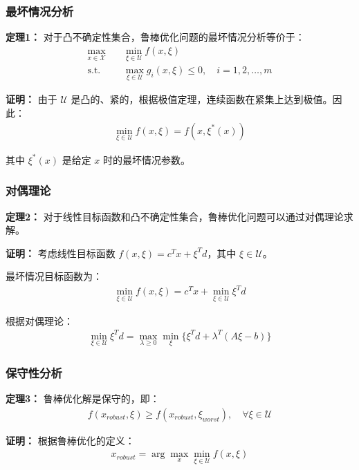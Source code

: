 \subsubsection{最坏情况分析}

\textbf{定理1：} 对于凸不确定性集合，鲁棒优化问题的最坏情况分析等价于：
\begin{align}
\max_{x \in \mathcal{X}} \quad & \min_{\xi \in \mathcal{U}} f(x, \xi) \\
\text{s.t.} \quad & \max_{\xi \in \mathcal{U}} g_i(x, \xi) \leq 0, \quad i = 1, 2, \ldots, m
\end{align}

\textbf{证明：}
由于 $\mathcal{U}$ 是凸的、紧的，根据极值定理，连续函数在紧集上达到极值。因此：
\begin{align}
\min_{\xi \in \mathcal{U}} f(x, \xi) = f(x, \xi^*(x))
\end{align}

其中 $\xi^*(x)$ 是给定 $x$ 时的最坏情况参数。

\subsubsection{对偶理论}

\textbf{定理2：} 对于线性目标函数和凸不确定性集合，鲁棒优化问题可以通过对偶理论求解。

\textbf{证明：}
考虑线性目标函数 $f(x, \xi) = c^T x + \xi^T d$，其中 $\xi \in \mathcal{U}$。

最坏情况目标函数为：
\begin{align}
\min_{\xi \in \mathcal{U}} f(x, \xi) = c^T x + \min_{\xi \in \mathcal{U}} \xi^T d
\end{align}

根据对偶理论：
\begin{align}
\min_{\xi \in \mathcal{U}} \xi^T d = \max_{\lambda \geq 0} \min_{\xi} \{\xi^T d + \lambda^T (A\xi - b)\}
\end{align}

\subsubsection{保守性分析}

\textbf{定理3：} 鲁棒优化解是保守的，即：
\begin{align}
f(x_{robust}, \xi) \geq f(x_{robust}, \xi_{worst}), \quad \forall \xi \in \mathcal{U}
\end{align}

\textbf{证明：}
根据鲁棒优化的定义：
\begin{align}
x_{robust} = \arg\max_{x} \min_{\xi \in \mathcal{U}} f(x, \xi)
\end{align}

